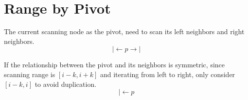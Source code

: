 \section{Range by Pivot}
 The current scanning node as the pivot, need to scan its left neighbors and right neighbors. 
$$
|\leftarrow p \rightarrow |
$$

 If the relationship between the pivot and its neighbors is symmetric, since scanning range is $[i-k, i+k]$ and iterating from left to right, only consider $[i-k, i]$ to avoid duplication.
$$
|\leftarrow p
$$


